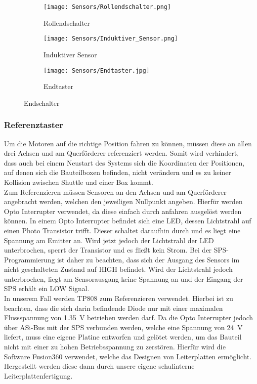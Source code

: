 \begin{figure}[H]
    \centering
    \begin{subfigure}{.3\textwidth}
        \centering
        \texttt{[image: Sensors/Rollendschalter.png]}
        \caption{Rollendschalter \cite{schmersal_pic}}
        \label{roll_sens}
    \end{subfigure}%
    \begin{subfigure}{.3\textwidth}
        \centering
        \texttt{[image: Sensors/Induktiver\_Sensor.png]}
        \caption{Induktiver Sensor \cite{induktiv_sensor}}
        \label{ind_sens}
    \end{subfigure}%
    \begin{subfigure}{.3\textwidth}
        \centering
        \texttt{[image: Sensors/Endtaster.jpg]}
        \caption{Endtaster}
        \label{tast_sens}
    \end{subfigure}
    \caption{Endschalter}
    \label{ulr}
\end{figure}

\subsubsection{Referenztaster}
Um die Motoren auf die richtige Position fahren zu können, müssen diese an allen drei Achsen und am Querförderer referenziert werden. Somit wird verhindert, dass auch bei einem Neustart des Systems sich die Koordinaten der Positionen, auf denen sich die Bauteilboxen befinden, nicht verändern und es zu keiner Kollision zwischen Shuttle und einer Box kommt.\\
Zum Referenzieren müssen Sensoren an den Achsen und am Querförderer angebracht werden, welchen den jeweiligen Nullpunkt angeben. Hierfür werden Opto Interrupter verwendet, da diese einfach durch anfahren ausgelöst werden können. In einem Opto Interrupter befindet sich eine LED, dessen Lichtstrahl auf einen Photo Transistor trifft. Dieser schaltet daraufhin durch und es liegt eine Spannung am Emitter an. Wird jetzt jedoch der Lichtstrahl der LED unterbrochen, sperrt der Transistor und es fließt kein Strom. Bei der SPS-Programmierung ist daher zu beachten, dass sich der Ausgang des Sensors im nicht geschalteten Zustand auf HIGH befindet. Wird der Lichtstrahl jedoch unterbrochen, liegt am Sensorausgang keine Spannung an und der Eingang der SPS erhält ein LOW Signal.\\
In unserem Fall werden TP808 zum Referenzieren verwendet. Hierbei ist zu beachten, dass die sich darin befindende Diode nur mit einer maximalen Flussspannung von \qty{1.35}{\volt} betrieben werden darf.\cite{TP808} Da die Opto Interrupter jedoch über ASi-Bus mit der SPS verbunden werden, welche eine Spannung von \qty{24}{\volt} liefert, muss eine eigene Platine entworfen und gelötet werden, um das Bauteil nicht mit einer zu hohen Betriebsspannung zu zerstören. Hierfür wird die Software Fusion360 verwendet, welche das Designen von Leiterplatten ermöglicht. Hergestellt werden diese dann durch unsere eigene schulinterne Leiterplattenfertigung.

